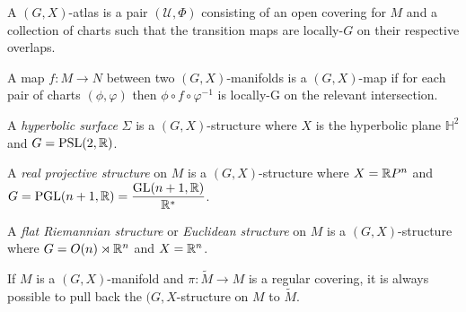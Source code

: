 \begin{definition}
    A $(G,X)$-atlas is a pair $(\mathcal{U}, \Phi)$  consisting of an open covering for $M$
    and a collection of charts such that the transition maps are locally-$G$ on their respective overlaps.
\end{definition}

\begin{definition}
    A map $f: M \to N$ between two $(G,X)$-manifolds is a $(G,X)$-map if for each pair of charts
    $(\phi, \varphi)$ then $\phi \circ f \circ \varphi^{-1}$ is locally-G on the relevant intersection.
\end{definition}
\begin{eg}
    A \emph{hyperbolic surface} $\Sigma$ is a $(G, X)$-structure where $X$ is the hyperbolic plane $\mathbb{H}^2$ and
    $G = \mathrm{PSL}(2, \mathbb{R})$.
\end{eg}
\begin{eg}
    A \emph{real projective structure} on $M$ is a $(G, X)$-structure where $X = \mathbb{R} P^n$ and $G = \mathrm{PGL}(n+1, \mathbb{R}) = \dfrac{ \mathrm{GL}(n+1, \mathbb{R})}{\mathbb{R}^{*}}$.
\end{eg}
\begin{eg}
    A \emph{flat Riemannian structure} or \emph{Euclidean structure} on $M$ is a $(G,X)$-structure where $G = O(n) \rtimes \mathbb{R}^n$ and $X = \mathbb{R}^n$.
\end{eg}

If $M$ is a $(G,X)$-manifold and $\pi: \tilde{M} \to M$ is a regular covering,
it is always possible to pull back the $(G,X$-structure on $M$ to $\tilde{M}$.

